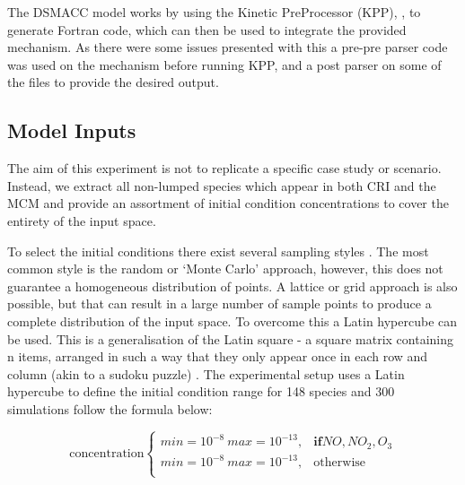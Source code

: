 The DSMACC model works by using the Kinetic PreProcessor (KPP), \citep{kpp}, to generate Fortran code, which can then be used to integrate the provided mechanism. As there were some issues presented with this a pre-pre parser code was used on the mechanism before running KPP, and a post parser on some of the files to provide the desired output. 

\subsection{Model Inputs}
The aim of this experiment is not to replicate a specific case study or scenario. Instead, we extract all non-lumped species which appear in both CRI and the MCM and provide an assortment of initial condition concentrations to cover the entirety of the input space.

To select the initial conditions there exist several sampling styles \cite{sampling}. The most common style is the random or `Monte Carlo' approach, however, this does not guarantee a homogeneous distribution of points. A lattice or grid approach is also possible, but that can result in a large number of sample points to produce a complete distribution of the input space. To overcome this a Latin hypercube can be used. This is a generalisation of the Latin square  -  a square matrix containing n items, arranged in such a way that they only appear once in each row and column (akin to a sudoku puzzle) \cite{lsq}. The experimental setup uses a Latin hypercube to define the initial condition range for 148 species and 300 simulations follow the formula below:

\begin{equation}
\text{concentration}
    \begin{cases}
      min = 10^{-8} \ max=10^{-13} , & \mathbf{if} NO,NO_2,O_3\\
      min = 10^{-8} \ max=10^{-13} , & \text{otherwise}\\
    \end{cases}
\label{eqn:icslhs}
  \end{equation}